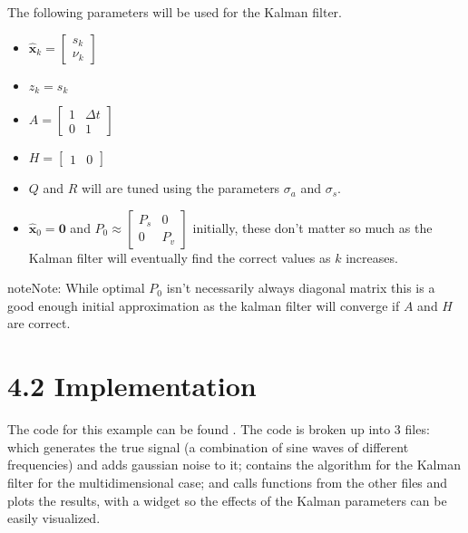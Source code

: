 \documentclass[letterpaper,10pt,english]{jupyterBook}
\begin{document}
\sphinxAtStartPar
The following parameters will be used for the Kalman filter.
\begin{itemize}
\item {} 
\sphinxAtStartPar
\(\hat{\boldsymbol{x}}_k = \begin{bmatrix} s_k \\ \nu_k \end{bmatrix}\)

\item {} 
\sphinxAtStartPar
\(z_k = s_k\)

\item {} 
\sphinxAtStartPar
\(A = \begin{bmatrix} 1 & \Delta t \\ 0 & 1 \end{bmatrix}\)

\item {} 
\sphinxAtStartPar
\(H = \begin{bmatrix} 1 & 0 \end{bmatrix}\)

\item {} 
\sphinxAtStartPar
\(Q\) and \(R\) will are tuned using the parameters \(\sigma_a\) and \(\sigma_s\).

\item {} 
\sphinxAtStartPar
\(\boldsymbol{\hat{x}}_0 = \boldsymbol{0}\) and \(P_0 \approx \begin{bmatrix} P_s & 0 \\ 0 & P_v\end{bmatrix}\) initially, these don’t matter so much as the Kalman filter will eventually find the correct values as \(k\) increases.

\end{itemize}

\begin{sphinxadmonition}{note}{Note:}
\sphinxAtStartPar
While optimal \(P_0\) isn’t necessarily always diagonal matrix this is a good enough initial approximation as the kalman filter will converge if \(A\) and \(H\) are correct.
\end{sphinxadmonition}


\section{4.2 Implementation}
\label{\detokenize{4ExampleVelocityFromPosition:implementation}}
\sphinxAtStartPar
The code for this example can be found . The code is broken up into 3 files:  which generates the true signal (a combination of sine waves of different frequencies) and adds gaussian noise to it;  contains the algorithm for the Kalman filter for the multidimensional case; and  calls functions from the other files and plots the results, with a widget so the effects of the Kalman parameters can be easily visualized.
\end{document}
